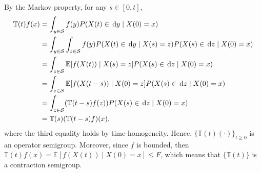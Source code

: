 By the Markov property, for any \(s\in[0,t]\), 
\begin{align*}
	\mathbb T(t)f(x)&=\int_{y\in\mathcal{S}} f(y) P(X(t)\in\, \mathrm{d} y \mid X(0)=x)
	\\&=\int_{y\in\mathcal{S}}\int_{z\in\mathcal S}f(y) P(X(t)\in\, \mathrm{d} y\mid X(s)=z) P(X(s)\in\, \mathrm{d} z\mid X(0)=x)
	\\&=\int_{z\in\mathcal S}\mathbb E[f(X(t))\mid X(s)=z] P(X(s)\in\, \mathrm{d} z\mid X(0)=x)
	\\&=\int_{z\in\mathcal S} \mathbb E[f(X(t-s))\mid X(0)=z]P(X(s)\in\, \mathrm{d} z\mid X(0)=x)
	\\&=\int_{z\in\mathcal S} (\mathbb T(t-s)f(z))P(X(s)\in\, \mathrm{d} z\mid X(0)=x)
	\\&=\mathbb T(s) (\mathbb T(t-s)f)(x),
\end{align*}
where the third equality holds by time-homogeneity. Hence, \(\{\mathbb T(t)(\cdot)\}_{t\geq 0}\) is an operator semigroup. Moreover, since \(f\) is bounded, then \(\mathbb T(t)f(x) = \mathbb E[f(X(t))\mid X(0)=x] \leq F\), which means that \(\{\mathbb T(t)\}\) is a contraction semigroup.


